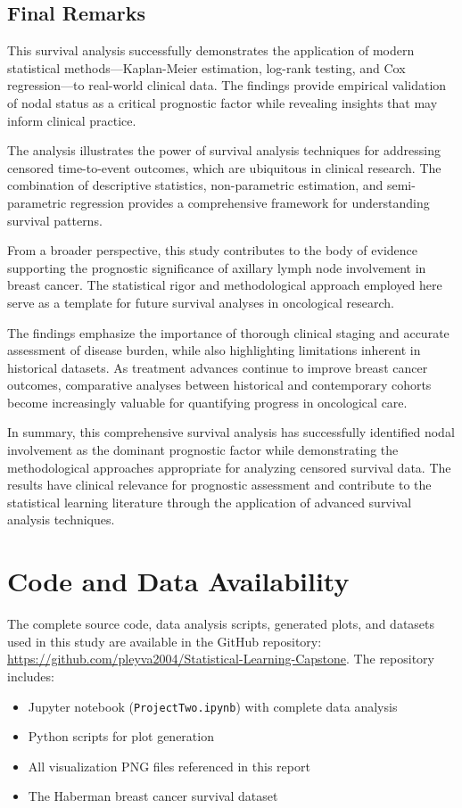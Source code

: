 \documentclass[12pt,a4paper]{article}
\begin{document}
\subsection{Final Remarks}

This survival analysis successfully demonstrates the application of modern statistical methods—Kaplan-Meier estimation, log-rank testing, and Cox regression—to real-world clinical data. The findings provide empirical validation of nodal status as a critical prognostic factor while revealing insights that may inform clinical practice.

The analysis illustrates the power of survival analysis techniques for addressing censored time-to-event outcomes, which are ubiquitous in clinical research. The combination of descriptive statistics, non-parametric estimation, and semi-parametric regression provides a comprehensive framework for understanding survival patterns.

From a broader perspective, this study contributes to the body of evidence supporting the prognostic significance of axillary lymph node involvement in breast cancer. The statistical rigor and methodological approach employed here serve as a template for future survival analyses in oncological research.

The findings emphasize the importance of thorough clinical staging and accurate assessment of disease burden, while also highlighting limitations inherent in historical datasets. As treatment advances continue to improve breast cancer outcomes, comparative analyses between historical and contemporary cohorts become increasingly valuable for quantifying progress in oncological care.

In summary, this comprehensive survival analysis has successfully identified nodal involvement as the dominant prognostic factor while demonstrating the methodological approaches appropriate for analyzing censored survival data. The results have clinical relevance for prognostic assessment and contribute to the statistical learning literature through the application of advanced survival analysis techniques.

\section{Code and Data Availability}

The complete source code, data analysis scripts, generated plots, and datasets used in this study are available in the GitHub repository: \url{https://github.com/pleyva2004/Statistical-Learning-Capstone}. The repository includes:
\begin{itemize}
    \item Jupyter notebook (\texttt{ProjectTwo.ipynb}) with complete data analysis
    \item Python scripts for plot generation
    \item All visualization PNG files referenced in this report
    \item The Haberman breast cancer survival dataset
\end{itemize}
\end{document}
